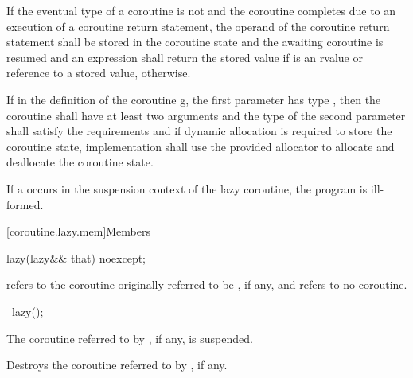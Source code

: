{\pnum
If the eventual type of a coroutine  is not  and the coroutine completes due to an execution of a coroutine return statement, the operand of the coroutine return statement shall be stored in the coroutine state and the awaiting coroutine  is resumed and an expression  shall return the stored value if  is an rvalue or reference to a stored value, otherwise.

\pnum
If in the definition of the coroutine g, the first parameter has type , then the coroutine shall have at least two arguments and the type of the second parameter shall satisfy the  requirements and if dynamic allocation is required to store the coroutine state, implementation shall use the provided allocator to allocate and deallocate the coroutine state.

\pnum
If a  occurs
in the suspension context of the lazy coroutine,
the program is ill-formed.

[coroutine.lazy.mem]{Members}
\begin{itemdecl}
lazy(lazy&& that) noexcept;
\end{itemdecl}

\begin{itemdescr}
\pnum
\ensures
{} refers to the coroutine
originally referred to be , if any,
and  refers to no coroutine.
\end{itemdescr}

\begin{itemdecl}
~lazy();
\end{itemdecl}

\begin{itemdescr}
\pnum
\expects
The coroutine referred to by , if any, is suspended.

\pnum
\effects
Destroys the coroutine referred to by , if any.
\end{itemdescr}
} %

